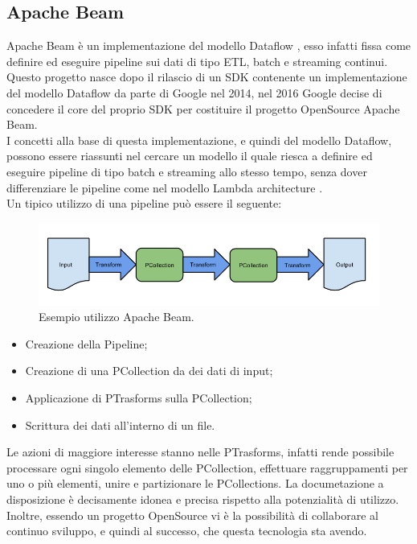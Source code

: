 \subsection{Apache Beam}
Apache Beam è un implementazione del modello Dataflow \cite{modelloDataflow}, esso infatti fissa come definire ed eseguire pipeline sui dati di tipo \gls{ETL}, batch e streaming continui. Questo progetto nasce dopo il rilascio di un \gls{SDK} contenente un implementazione del modello Dataflow da parte di Google nel 2014, nel 2016 Google decise di concedere il core del proprio SDK per costituire il progetto \gls{OpenSource} Apache Beam.
\\ I concetti alla base di questa implementazione, e quindi del modello Dataflow, possono essere riassunti nel cercare un modello il quale riesca a definire ed eseguire pipeline di tipo batch e streaming allo stesso tempo, senza dover differenziare le pipeline come nel modello Lambda architecture \cite{Lambdaarchitecture}.
\\ Un tipico utilizzo di una pipeline può essere il seguente:
\begin{figure}[h!]
	\centering
	\includegraphics[scale=0.5]{figures/design-your-pipeline-linear}
	\caption[Esempio utilizzo Apache Beam. ]{Esempio utilizzo Apache Beam.
		\label{fig:logoGCP}}
\end{figure}	
\begin{itemize}
	\item Creazione della Pipeline;
	\item Creazione di una PCollection da dei dati di input;
	\item Applicazione di PTrasforms sulla PCollection;
	\item Scrittura dei dati all'interno di un file.
\end{itemize}
Le azioni di maggiore interesse stanno nelle PTrasforms, infatti rende possibile processare ogni singolo elemento delle PCollection, effettuare raggruppamenti per uno o più elementi, unire  e partizionare le PCollections.
La documetazione a disposizione è decisamente idonea e precisa rispetto alla potenzialità di utilizzo. Inoltre, essendo un progetto OpenSource vi è la possibilità di collaborare al continuo sviluppo, e quindi al successo, che questa tecnologia sta avendo.
